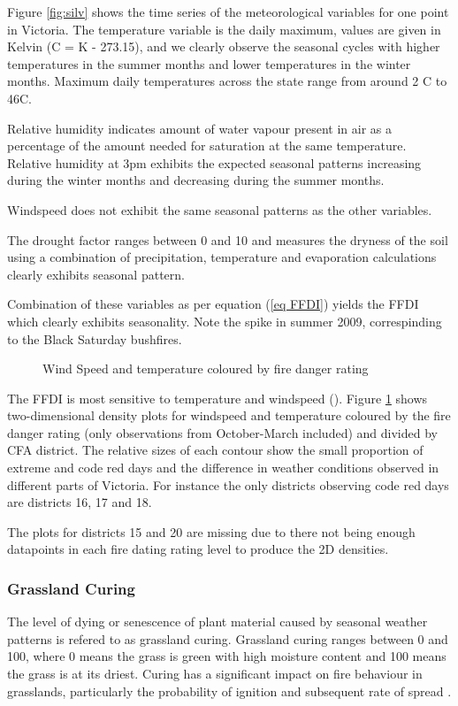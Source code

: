 \documentclass{article}
\begin{document}
Figure \ref{fig:silv} shows the time series of the meteorological variables for one point in Victoria. The temperature variable is the daily maximum, values are given in Kelvin (\degree C = K - 273.15), and we clearly observe the seasonal cycles with higher temperatures in the summer months and lower temperatures in the winter months. Maximum daily temperatures across the state range from around 2 \degree C to 46\degree  C. 

Relative humidity indicates amount of water vapour present in air as a percentage of the amount needed for saturation at the same temperature. Relative humidity at 3pm exhibits the expected seasonal patterns increasing during the winter months and decreasing during the summer months. 

Windspeed does not exhibit the same seasonal patterns as the other variables. 

The drought factor ranges between 0 and 10 and measures the dryness of the soil using a combination of precipitation, temperature and evaporation calculations \citep{keetch68} clearly exhibits seasonal pattern.

Combination of these variables as per equation (\ref{eq FFDI}) yields the FFDI which clearly exhibits seasonality. Note the spike in summer 2009, correspinding to the Black Saturday bushfires.

\begin{figure}[h]
	\centering 
	\caption{Wind Speed and temperature coloured by fire danger rating} 
	\label{fig:tw_fdr} 
\end{figure}

The FFDI is most sensitive to temperature and windspeed (\cite{dowdy10}). Figure \ref{fig:tw_fdr} shows two-dimensional density plots for windspeed and temperature coloured by the fire danger rating (only observations from October-March included) and divided by CFA district. The relative sizes of each contour show the small proportion of extreme and code red days and the difference in weather conditions observed in different parts of Victoria. For instance the only districts observing code red days are districts 16, 17 and 18. 

The plots for districts 15 and 20 are missing due to there not being enough datapoints in each fire dating rating level to produce the 2D densities.  
 
\subsubsection{Grassland Curing}
The level of dying or senescence of plant material caused by seasonal weather patterns is refered to as grassland curing. Grassland curing ranges between 0 and 100, where 0 means the grass is green with high moisture content and 100 means the grass is at its driest. Curing has a significant impact on fire behaviour in grasslands, particularly the probability of ignition and subsequent rate of spread \citep{cheney08}. 
\end{document}

